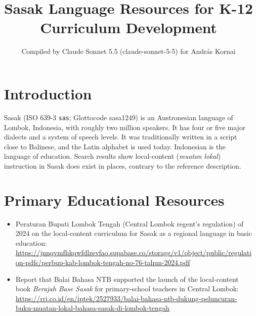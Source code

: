\documentclass[12pt]{article}
\title{Sasak Language Resources for K-12 Curriculum Development}
\author{Compiled by Claude Sonnet 5.5 (claude-sonnet-5-5) for Andr\'as Kornai}
\date{}
\begin{document}
\maketitle

\section{Introduction}
Sasak (ISO 639-3 \texttt{sas}; Glottocode sasa1249) is an Austronesian language of Lombok, Indonesia, with roughly two million speakers. It has four or five major dialects and a system of speech levels. It was traditionally written in a script close to Balinese, and the Latin alphabet is used today. Indonesian is the language of education. Search results show local-content (\emph{muatan lokal}) instruction in Sasak does exist in places, contrary to the reference description.

\section{Primary Educational Resources}
\begin{itemize}
\item Peraturan Bupati Lombok Tengah (Central Lombok regent's regulation) of 2024 on the local-content curriculum for Sasak as a regional language in basic education: \url{https://jnnqvmfhkqwfdlzevfao.supabase.co/storage/v1/object/public/regulation-pdfs/perbup-kab-lombok-tengah-no-76-tahun-2024.pdf}
\item Report that Balai Bahasa NTB supported the launch of the local-content book \emph{Berajah Base Sasak} for primary-school teachers in Central Lombok: \url{https://rri.co.id/en/iptek/2527933/balai-bahasa-ntb-dukung-peluncuran-buku-muatan-lokal-bahasa-sasak-di-lombok-tengah}
\end{itemize}
\end{document}
